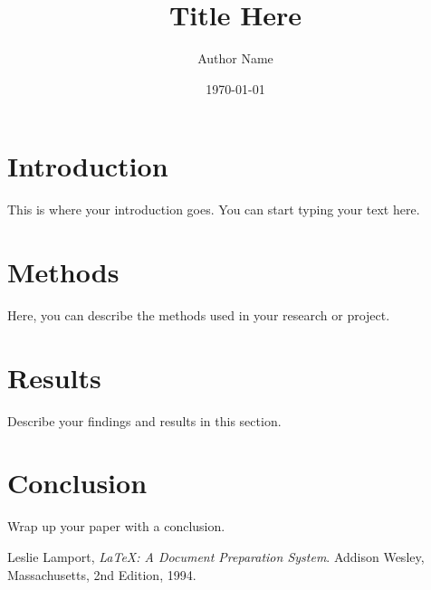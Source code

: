 \documentclass{article}
\title{Title Here}
\author{Author Name}
\date{\today}
\begin{document}
\maketitle

\section{Introduction}

This is where your introduction goes. You can start typing your text here.

\section{Methods}

Here, you can describe the methods used in your research or project.

\section{Results}

Describe your findings and results in this section.

\section{Conclusion}

Wrap up your paper with a conclusion.

\begin{thebibliography}{9}
  Leslie Lamport,
  \emph{\LaTeX: A Document Preparation System}.
  Addison Wesley, Massachusetts,
  2nd Edition,
  1994.
\end{thebibliography}
\end{document}
